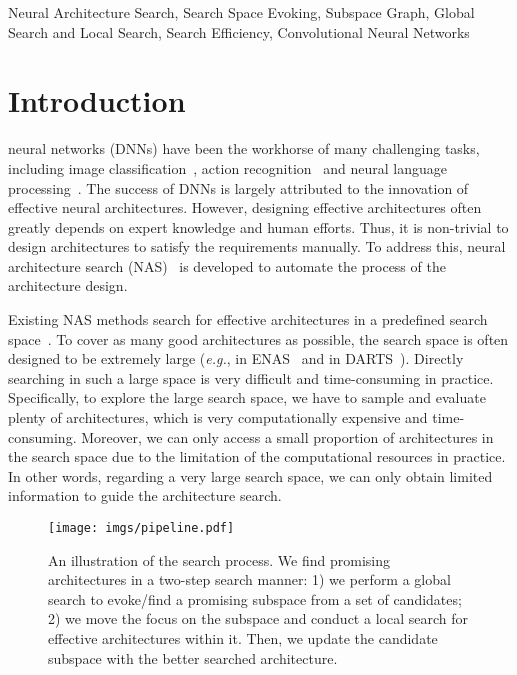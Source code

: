 \documentclass[lettersize,journal]{IEEEtran}
\def\eg{\emph{e.g.}} \def\Eg{\emph{E.g.}}
\begin{document}
\begin{IEEEkeywords}
Neural Architecture Search, Search Space Evoking, Subspace Graph, Global Search and Local Search, Search Efficiency, Convolutional Neural Networks
\end{IEEEkeywords}

\section{Introduction}
 neural networks (DNNs) have been the workhorse of many challenging tasks, including image classification~\cite{resnet,alexey2021vit,liu2021Swin,liu2021swinv2}, action recognition~\cite{duan2020omni,feichtenhofer2019slowfast,tu2019action,liu2022apsnet} and neural language processing~\cite{radford2018improving,brown2020language}.
The success of DNNs is largely attributed to the innovation of effective neural architectures.
However, designing effective architectures often greatly depends on expert knowledge and human efforts.
Thus, it is non-trivial to design architectures to satisfy the requirements manually.
To address this, neural architecture search (NAS)~\cite{zoph2016neural} is developed to automate the process of the architecture design.

Existing NAS methods search for effective architectures in a predefined search space~\cite{zoph2016neural,liu2018darts,tan2019mnasnet}.
To cover as many good architectures as possible, the search space is often designed to be extremely large (\eg,  in ENAS~\cite{pham2018efficient} and  in DARTS~\cite{liu2018darts}).
Directly searching in such a large space is very difficult and time-consuming in practice.
Specifically, to explore the large search space, we have to sample and evaluate plenty of architectures, which is very computationally expensive and time-consuming.
Moreover, we can only access a small proportion of architectures in the search space due to the limitation of the computational resources in practice.
In other words, regarding a very large search space, we can only obtain limited information to guide the architecture search.


\begin{figure*}[t]
\centering
\texttt{[image: imgs/pipeline.pdf]}
\caption{An illustration of the search process.
We find promising architectures in a two-step search manner:
1) we perform a global search to evoke/find a promising subspace from a set of candidates;
2) we move the focus on the subspace and conduct a local search for effective architectures within it.
Then, we update the candidate subspace with the better searched architecture.
}
\label{fig:graph_space}
\end{figure*}
\end{document}
